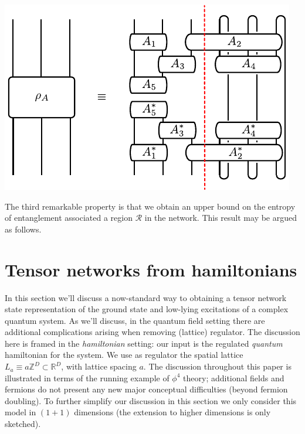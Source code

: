 \documentclass[twocolumn,lengthcheck,superscriptaddress]{revtex4-1}
\theoremstyle{definition}
\theoremstyle{remark}
\begin{document}
\begin{center} 
\includegraphics{ptrace.pdf}
\end{center}

The third remarkable property is that we obtain an upper bound on the entropy of entanglement associated a region $\mathcal{R}$ in the network. This result may be argued as follows.  

\section{Tensor networks from hamiltonians}\hspace{-1em}
In this section we'll discuss a now-standard way to obtaining a tensor network state representation of the ground state and low-lying excitations of a complex quantum system. As we'll discuss, in the quantum field setting there are additional complications arising when removing (lattice) regulator. The discussion here is framed in the \emph{hamiltonian} setting: our input is the regulated \emph{quantum} hamiltonian for the system. We use as regulator the spatial lattice $L_a \equiv a\mathbb{Z}^D\subset \mathbb{R}^D$, with lattice spacing $a$. The discussion throughout this paper is illustrated in terms of the running example of $\phi^4$ theory; additional fields and fermions do not present any new major conceptual difficulties (beyond fermion doubling). To further simplify our discussion in this section we only consider this model in $(1+1)$ dimensions (the extension to higher dimensions is only sketched). 
\end{document}
